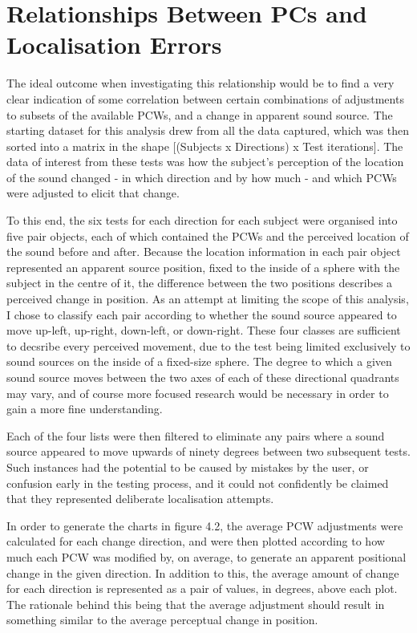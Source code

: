 \section{Relationships Between PCs and Localisation Errors}
The ideal outcome when investigating this relationship would be to find a very clear indication of some correlation between certain combinations of adjustments to subsets of the available PCWs, and a change in apparent sound source. The starting dataset for this analysis drew from all the data captured, which was then sorted into a matrix in the shape [(Subjects x Directions) x Test iterations]. The data of interest from these tests was how the subject's perception of the location of the sound changed - in which direction and by how much - and which PCWs were adjusted to elicit that change. 

To this end, the six tests for each direction for each subject were organised into five pair objects, each of which contained the PCWs and the perceived location of the sound before and after. Because the location information in each pair object represented an apparent source position, fixed to the inside of a sphere with the subject in the centre of it, the difference between the two positions describes a perceived change in position. As an attempt at limiting the scope of this analysis, I chose to classify each pair according to whether the sound source appeared to move up-left, up-right, down-left, or down-right. These four classes are sufficient to decsribe every perceived movement, due to the test being limited exclusively to sound sources on the inside of a fixed-size sphere. The degree to which a given sound source moves between the two axes of each of these directional quadrants may vary, and of course more focused research would be necessary in order to gain a more fine understanding.

Each of the four lists were then filtered to eliminate any pairs where a sound source appeared to move upwards of ninety degrees between two subsequent tests. Such instances had the potential to be caused by mistakes by the user, or confusion early in the testing process, and it could not confidently be claimed that they represented deliberate localisation attempts. 

In order to generate the charts in figure 4.2, the average PCW adjustments were calculated for each change direction, and were then plotted according to how much each PCW was modified by, on average, to generate an apparent positional change in the given direction. In addition to this, the average amount of change for each direction is represented as a pair of values, in degrees, above each plot. The rationale behind this being that the average adjustment should result in something similar to the average perceptual change in position.

